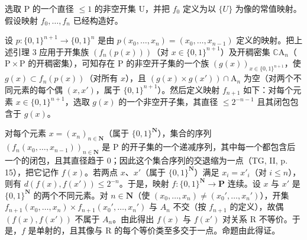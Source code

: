 选取 P 的一个直径 \(\leqslant 1\) 的非空开集 U，并把 \(f_{0}\) 定义为以 \(\{U\}\) 为像的常值映射。假设映射 \(f_{0}, \ldots, f_{n}\) 已经构造好。

设 \(p \colon \{0,1\}^{n+1} \to \{0,1\}^n\) 是由 \(p(x_0, \ldots, x_n) = (x_0, \ldots, x_{n-1})\) 定义的映射。把上述引理 3 应用于开集族 \((f_n(p(x)))\)（对 \(x \in \{0,1\}^{n+1}\)）及开稠密集 \(\mathbb{C}\mathrm{A}_n\)（\(\mathrm{P} \times \mathrm{P}\) 的开稠密集），可知存在 P 的非空开子集的一个族 \((g(x))_{x \in \{0,1\}^{n+1}}\)，使 \(g(x) \subset f_n(p(x))\)（对所有 \(x\)），且 \((g(x) \times g(x')) \cap \mathrm{A}_n\) 为空（对两个不同元素的每个偶 \((x,x')\)，属于 \(\{0,1\}^{n+1}\)）。然后定义映射 \(f_{n+1}\) 如下：对每个元素 \(x \in \{0,1\}^{n+1}\)，选取 \(g(x)\) 的一个非空开子集，其直径 \(\leqslant 2^{-n-1}\) 且其闭包包含于 \(g(x)\)。

对每个元素 \(x = (x_n)_{n \in \mathbf{N}}\)（属于 \(\{0,1\}^{\mathbf{N}}\)），集合的序列 \((f_n(x_0, \ldots, x_{n-1}))_{n \in \mathbf{N}}\) 是 P 的开子集的一个递减序列，其中每一个都包含后一个的闭包，且其直径趋于 0；因此这个集合序列的交退缩为一点（TG, II, p. 15），把它记作 \(f(x)\)。若两点 \(x\)、\(x'\)（属于 \(\{0,1\}^{\mathbf{N}}\)）满足 \(x_i = x'_i\)（对 \(i \leqslant n\)），则有 \(d(f(x), f(x')) \leqslant 2^{-n}\)。于是，映射 \(f: \{0,1\}^{\mathbf{N}} \to \mathbf{P}\) 连续。设 \(x\) 与 \(x'\) 是 \(\{0,1\}^{\mathbf{N}}\) 的两个不同元素。对 \(n \in \mathbf{N}\)（使 \((x_0, \ldots, x_n) \neq (x_0', \ldots, x_n')\)），开集 \(f_{n+1}(x_0, \ldots, x_n) \times f_{n+1}(x_0', \ldots, x_n')\) 与 \(A_n\) 不交（按 \(f_{n+1}\) 的定义），故偶 \((f(x), f(x'))\) 不属于 \(A_n\)。由此得出 \(f(x)\) 与 \(f(x')\) 对关系 R 不等价。于是，\(f\) 是单射的，且其像与 R 的每个等价类至多交于一点。命题由此得证。

